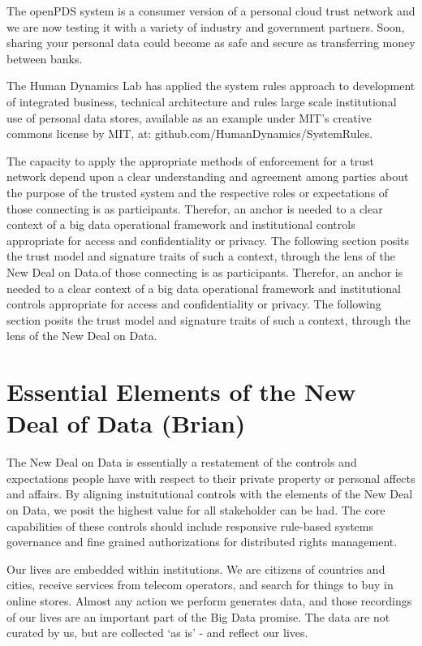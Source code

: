 The openPDS system is a consumer version of a personal cloud trust network and we are now testing it with a variety of industry and government partners.
Soon, sharing your personal data could become as safe and secure as transferring money between banks.

The Human Dynamics Lab has applied the system rules approach to development of integrated business, technical architecture and rules large scale institutional use of personal data stores, available as an example under MIT's creative commons license by MIT, at: github.com/HumanDynamics/SystemRules. 

The capacity to apply the appropriate methods of enforcement for a trust network depend upon a clear understanding and agreement among parties about the purpose of the trusted system and the respective roles or expectations of those connecting is as participants.
Therefor, an anchor is needed to a clear context of a big data operational framework and institutional controls appropriate for access and confidentiality or privacy.
The following section posits the trust model and signature traits of such a context, through the lens of the New Deal on Data.of those connecting is as participants.
Therefor, an anchor is needed to a clear context of a big data operational framework and institutional controls appropriate for access and confidentiality or privacy.
The following section posits the trust model and signature traits of such a context, through the lens of the New Deal on Data.

\section{Essential Elements of the New Deal of Data (Brian)}

The New Deal on Data is essentially a restatement of the controls and expectations people have with respect to their private property or personal affects and affairs.  By aligning instuitutional controls with the elements of the New Deal on Data, we posit the highest value for all stakeholder can be had.  The core capabilities of these controls should include responsive rule-based systems governance and fine grained authorizations for distributed rights management.

Our lives are embedded within institutions.
We are citizens of countries and cities, receive services from telecom operators, and search for things to buy in online stores.
Almost any action we perform generates data, and those recordings of our lives are an important part of the Big Data promise.
The data are not curated by us, but are collected `as is' - and reflect our lives.

